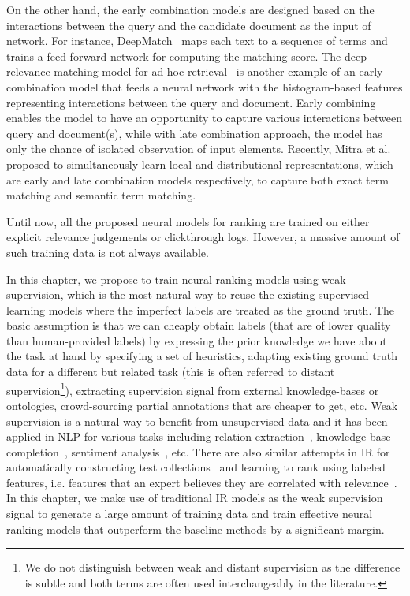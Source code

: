 On the other hand, the early combination models are designed based on the interactions between the query and the candidate document as the input of network. 
For instance, DeepMatch~\citep{Lu:2013} maps each text to a sequence of terms and trains a feed-forward network for computing the matching score. 
The deep relevance matching model for ad-hoc retrieval~\citep{Guo:2016} is another example of an early combination model that feeds a neural network with the  histogram-based features representing interactions between the query and document. 
Early combining enables the model to have an opportunity to capture various interactions between query and document(s), while with late combination approach, the model has only the chance of isolated observation of input elements. Recently, Mitra et al.~\citep{Mitra:2016} proposed to simultaneously learn local and distributional representations, which are early and late combination models respectively,  to capture both exact term matching and semantic term matching.

Until now, all the proposed neural models for ranking are trained on either explicit relevance judgements or clickthrough logs. However, a massive amount of such training data is not always available. 

In this chapter, we propose to train neural ranking models using weak supervision, which is the most natural way to reuse the existing supervised learning models where the imperfect labels are treated as the ground truth.
The basic assumption is that we can cheaply obtain labels (that are of lower quality than human-provided labels) by expressing the prior knowledge we have about the task at hand by specifying a set of heuristics, adapting existing ground truth data for a different but related task (this is often referred to distant supervision\footnote{We do not distinguish between weak and distant supervision as the difference is subtle and both terms are often used interchangeably in the literature.}), extracting supervision signal from external knowledge-bases or ontologies, crowd-sourcing partial annotations that are cheaper to get, etc.
%
Weak supervision is a natural way to benefit from unsupervised data and it has been applied in NLP for various tasks including relation extraction~\citep{Bing:2015,Han:2016}, knowledge-base completion~\citep{Hoffmann:2011}, sentiment analysis~\citep{Severyn:2015:SemEval}, etc.  
There are also similar attempts in IR for automatically constructing test collections~\citep{Asadi:2011} and learning to rank using labeled features, i.e. features that an expert believes they are correlated with relevance~\citep{Diaz:2016:ictir}.
In this chapter, we make use of traditional IR models as the weak supervision signal to generate a large amount of training data and train effective neural ranking models that outperform the baseline methods by a significant margin.


